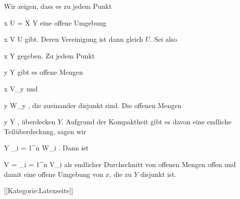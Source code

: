 Wir zeigen, dass es zu jedem Punkt

\mavergleichskette
{\vergleichskette
{ x
}
{ \in }{ U
}
{ = }{ X \setminus Y
}
{    }{
}
{   }{
}
}
{}{}{}
eine offene Umgebung

\mavergleichskette
{\vergleichskette
{ x
}
{ \in }{ V
}
{ \subseteq }{ U
}
{    }{
}
{   }{
}
}
{}{}{}
gibt. Deren Vereinigung ist dann gleich $U$. Sei also

\mavergleichskette
{\vergleichskette
{ x
}
{ \notin }{ Y
}
{  }{
}
{    }{
}
{   }{
}
}
{}{}{}
gegeben. Zu jedem Punkt

\mavergleichskette
{\vergleichskette
{ y
}
{ \in }{ Y
}
{  }{
}
{    }{
}
{   }{
}
}
{}{}{}
gibt es offene Mengen

\mavergleichskette
{\vergleichskette
{ x
}
{ \in }{ V_y
}
{  }{
}
{    }{
}
{   }{
}
}
{}{}{}
und

\mavergleichskette
{\vergleichskette
{ y
}
{ \in }{ W_y
}
{  }{
}
{    }{
}
{   }{
}
}
{}{}{,}
die zueinander disjunkt sind. Die offenen Mengen

 {}
 {y \in Y} {}
 {} {} {} {,}
überdecken $Y$. Aufgrund der Kompaktheit gibt es davon eine endliche Teilüberdeckung, sagen wir

\mavergleichskettedisp
{\vergleichskette
{ Y
}
{ \subseteq} { \bigcup_{i = 1}^n  W_i
}
{ } {
}
{ } {
}
{ } {
}
}
{}{}{.}
Dann ist

\mavergleichskette
{\vergleichskette
{ V
}
{ = }{ \bigcap_{i = 1}^n  V_i
}
{  }{
}
{    }{
}
{   }{
}
}
{}{}{}
als endlicher Durchschnitt von offenen Mengen offen und damit eine offene Umgebung von $x$, die zu $Y$ disjunkt ist.

 [[Kategorie:Latexseite]]
